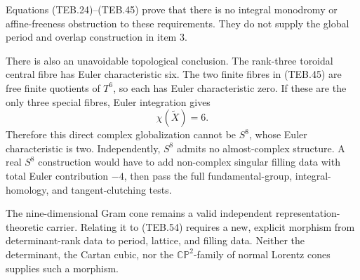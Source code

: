 Equations (TEB.24)--(TEB.45) prove that there is no integral monodromy or
affine-freeness obstruction to these requirements.  They do not supply the
global period and overlap construction in item 3.

There is also an unavoidable topological conclusion.  The rank-three
toroidal central fibre has Euler characteristic six.  The two finite fibres
in (TEB.45) are free finite quotients of \(T^6\), so each has Euler
characteristic zero.  If these are the only three special fibres, Euler
integration gives
\[
 \chi(\widetilde X)=6.                                  \tag{TEB.55}
\]
Therefore this direct complex globalization cannot be \(S^8\), whose Euler
characteristic is two.  Independently, \(S^8\) admits no almost-complex
structure.  A real \(S^8\) construction would have to add non-complex
singular filling data with total Euler contribution \(-4\), then pass the
full fundamental-group, integral-homology, and tangent-clutching tests.

The nine-dimensional Gram cone remains a valid independent
representation-theoretic carrier.  Relating it to (TEB.54) requires a new,
explicit morphism from determinant-rank data to period, lattice, and filling
data.  Neither the determinant, the Cartan cubic, nor the
\(\mathbb{CP}^2\)-family of normal Lorentz cones supplies such a morphism.
